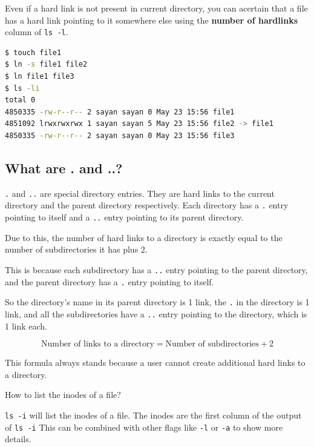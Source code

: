 Even if a hard link is not present in current directory, you can acertain that a file has a hard link pointing to it somewhere else using the \textbf{number of hardlinks} column of \texttt{ls -l}.

\begin{lstlisting}[language=bash]
$ touch file1
$ ln -s file1 file2
$ ln file1 file3
$ ls -li
total 0
4850335 -rw-r--r-- 2 sayan sayan 0 May 23 15:56 file1
4851092 lrwxrwxrwx 1 sayan sayan 5 May 23 15:56 file2 -> file1
4850335 -rw-r--r-- 2 sayan sayan 0 May 23 15:56 file3
\end{lstlisting}

\subsection{What are . and ..?}

\texttt{.} and \texttt{..} are special directory entries.
They are hard links to the current directory and the parent directory respectively.
Each directory has a \texttt{.} entry pointing to itself and a \texttt{..} entry pointing to its parent directory.

Due to this, the number of hard links to a directory is exactly equal to the number of subdirectories it has plus 2.

This is because each subdirectory has a \texttt{..} entry pointing to the parent directory, and the parent directory has a \texttt{.} entry pointing to itself.

So the directory's name in its parent directory is 1 link,
the \texttt{.} in the directory is 1 link,
and all the subdirectories have a \texttt{..} entry pointing to the directory, which is 1 link each.

\[
  \text{Number of links to a directory} = \text{Number of subdirectories} + 2
\]

This formula always stands because a user cannot create additional hard links to a directory.





\begin{qs}
  How to list the inodes of a file?
\end{qs}

\begin{ans}
  \texttt{ls -i} will list the inodes of a file.
  The inodes are the first column of the output of \texttt{ls -i}
  This can be combined with other flags like \texttt{-l} or \texttt{-a} to show more details.
\end{ans}

